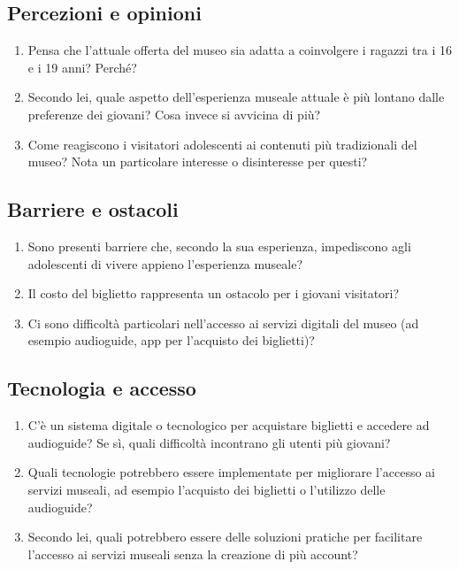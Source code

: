 \documentclass[a4paper, 12pt]{article}
\begin{document}
\subsection{\textcolor{subsectioncolor}{Percezioni e opinioni}}

\begin{enumerate}
    \item Pensa che l'attuale offerta del museo sia adatta a coinvolgere i ragazzi tra i 16 e i 19 anni? Perché?
    \item Secondo lei, quale aspetto dell'esperienza museale attuale è più lontano dalle preferenze dei giovani? Cosa invece si avvicina di più?
    \item Come reagiscono i visitatori adolescenti ai contenuti più tradizionali del museo? Nota un particolare interesse o disinteresse per questi?
\end{enumerate}

\subsection{\textcolor{subsectioncolor}{Barriere e ostacoli}}

\begin{enumerate}
    \item Sono presenti barriere che, secondo la sua esperienza, impediscono agli adolescenti di vivere appieno l'esperienza museale?
    \item Il costo del biglietto rappresenta un ostacolo per i giovani visitatori?
    \item Ci sono difficoltà particolari nell'accesso ai servizi digitali del museo (ad esempio audioguide, app per l'acquisto dei biglietti)?
\end{enumerate}

\subsection{\textcolor{subsectioncolor}{Tecnologia e accesso}}

\begin{enumerate}
    \item C'è un sistema digitale o tecnologico per acquistare biglietti e accedere ad audioguide? Se sì, quali difficoltà incontrano gli utenti più giovani?
    \item Quali tecnologie potrebbero essere implementate per migliorare l'accesso ai servizi museali, ad esempio l'acquisto dei biglietti o l'utilizzo delle audioguide?
    \item Secondo lei, quali potrebbero essere delle soluzioni pratiche per facilitare l'accesso ai servizi museali senza la creazione di più account?
\end{enumerate}
\end{document}
